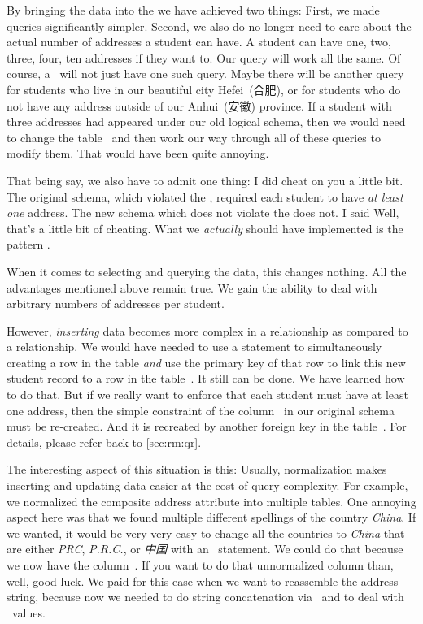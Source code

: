 By bringing the data into the  we have achieved two things:
First, we made queries significantly simpler.
Second, we also do no longer need to care about the actual number of addresses a student can have.
A student can have one, two, three, four, ten addresses if they want to.
Our query will work all the same.
Of course, a \db\ will not just have one such query.
Maybe there will be another query for students who live in our beautiful city Hefei~(合肥), or for students who do not have any address outside of our Anhui~(安徽) province.
If a student with three addresses had appeared under our old logical schema, then we would need to change the table~ and then work our way through all of these queries to modify them.
That would have been quite annoying.

That being say, we also have to admit one thing:
I did cheat on you a little bit.
The original schema, which violated the , required each student to have \emph{at least one} address.
The new schema which does not violate the  does not.
I said \emph{}
Well, that's a little bit of cheating.
What we \emph{actually} should have implemented is the pattern .

When it comes to selecting and querying the data, this changes nothing.
All the advantages mentioned above remain true.
We gain the ability to deal with arbitrary numbers of addresses per student.

However, \emph{inserting} data becomes more complex in a  relationship as compared to a  relationship.
We would have needed to use a  statement to simultaneously creating a row in the  table \emph{and} use the primary key of that row to link this new student record to a row in the table~.
It still can be done.
We have learned how to do that.
But if we really want to enforce that each student must have at least one address, then the simple  constraint of the column~ in our original schema must be re-created.
And it is recreated by another foreign key in the table~.
For details, please refer back to \cref{sec:rm:qr}.

The interesting aspect of this situation is this:
Usually, normalization makes inserting and updating data easier at the cost of query complexity.
For example, we normalized the composite address attribute into multiple tables.
One annoying aspect here was that we found multiple different spellings of the country \emph{China}.
If we wanted, it would be very very easy to change all the countries to \emph{China} that are either \emph{PRC}, \emph{P.R.C.}, or \emph{中国} with an ~statement.
We could do that because we now have the column~.
If you want to do that unnormalized  column than, well, good luck.
We paid for this ease when we want to reassemble the address string, because now we needed to do string concatenation via~\sqlil{||}\sqlIdx{\textbar\textbar} and  to deal with ~values.

